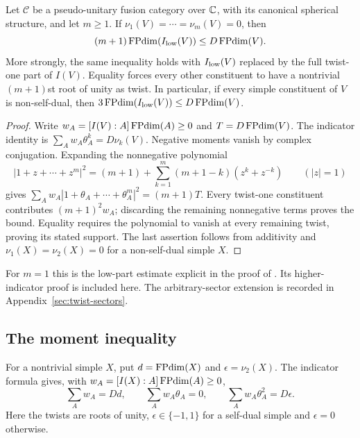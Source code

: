 \begin{theorem}\label{thm:higher-indicator}
Let $\mathcal C$ be a pseudo-unitary fusion category over $\mathbb C$, with its
canonical spherical structure, and let $m\geq1$. If
$\nu_1(V)=\cdots=\nu_m(V)=0$, then
\[
 (m+1)\operatorname{FPdim}(I_{\rm low}(V))\leq D\operatorname{FPdim}(V).
\]
More strongly, the same inequality holds with $I_{\rm low}(V)$ replaced
by the full twist-one part of $I(V)$. Equality forces every other
constituent to have a nontrivial $(m+1)$st root of unity as twist.
In particular, if every simple constituent of $V$ is non-self-dual, then
$3\operatorname{FPdim}(I_{\rm low}(V))\leq D\operatorname{FPdim}(V)$.
\end{theorem}
\begin{proof}
Write $w_A=[I(V):A]\operatorname{FPdim}(A)\geq0$ and $T=D\operatorname{FPdim}(V)$.
The indicator identity \cite[Theorem 4.1]{NgSchauenburg} is
$\sum_Aw_A\theta_A^k=D\nu_k(V)$. Negative moments vanish by complex
conjugation. Expanding the nonnegative polynomial
\[
 |1+z+\cdots+z^m|^2=(m+1)+
 \sum_{k=1}^m(m+1-k)(z^k+z^{-k})\qquad(|z|=1)
\]
gives $\sum_Aw_A|1+\theta_A+\cdots+\theta_A^m|^2=(m+1)T$.
Every twist-one constituent contributes $(m+1)^2w_A$; discarding the
remaining nonnegative terms proves the bound. Equality requires the
polynomial to vanish at every remaining twist, proving its stated support.
The last assertion follows from additivity and
$\nu_1(X)=\nu_2(X)=0$ for a non-self-dual simple $X$.
\end{proof}
For $m=1$ this is the low-part estimate explicit in the proof of
\cite[Theorem 2.21]{OstrikRank3}. Its higher-indicator proof is included here. The arbitrary-sector
extension is recorded in Appendix~\ref{sec:twist-sectors}.

\subsection{The moment inequality}
For a nontrivial simple $X$, put $d=\operatorname{FPdim}(X)$ and $\epsilon=\nu_2(X)$.
The indicator formula \cite[Theorem 4.1]{NgSchauenburg} gives, with
$w_A=[I(X):A]\operatorname{FPdim}(A)\geq0$,
\begin{equation}\label{eq:three-moments}
 \sum_A w_A=Dd,\qquad \sum_A w_A\theta_A=0,\qquad
 \sum_A w_A\theta_A^2=D\epsilon.
\end{equation}
Here the twists are roots of unity, $\epsilon\in\{-1,1\}$ for a self-dual
simple and $\epsilon=0$ otherwise.

